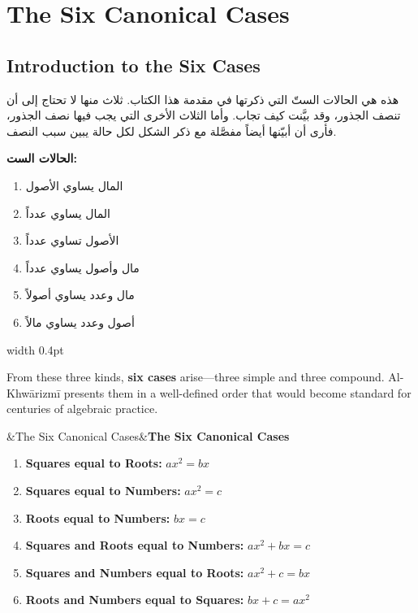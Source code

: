 \documentclass[11pt,a4paper,openany,oneside]{book}
\newenvironment{transbox}[1][]{%
  \smallskip\par\noindent
  \begin{lrbox}{\transboxsave}
  \begin{minipage}{\dimexpr\linewidth-2\fboxsep-2\fboxrule\relax}%
  \setlength{\parskip}{0.3em}%
  \ifx&#1&\else\textbf{#1}\\[0.2cm]\fi
}{%
  \end{minipage}%
  \end{lrbox}
  \fcolorbox{rulecolor}{transbg}{\usebox{\transboxsave}}%
  \smallskip}
\begin{document}
\chapter{The Six Canonical Cases}
\label{ch:six-cases}

\section*{Introduction to the Six Cases}

\noindent\begin{minipage}[t]{0.48\textwidth}
\raggedleft

\begin{Arabic}
هذه هي الحالات الستّ التي ذكرتها في مقدمة هذا الكتاب. ثلاث منها لا تحتاج إلى أن تنصف الجذور، وقد بيَّنت كيف تجاب. وأما الثلاث الأخرى التي يجب فيها نصف الجذور، فأرى أن أبيّنها أيضاً مفصَّلة مع ذكر الشكل لكل حالة يبين سبب النصف.

\textbf{الحالات الست:}
\begin{enumerate}[label=\arabic*.]
\item المال يساوي الأصول
\item المال يساوي عدداً
\item الأصول تساوي عدداً
\item مال وأصول يساوي عدداً
\item مال وعدد يساوي أصولاً
\item أصول وعدد يساوي مالاً
\end{enumerate}
\end{Arabic}

\end{minipage}%
\hfill\vrule width 0.4pt\hfill
\begin{minipage}[t]{0.48\textwidth}
\raggedright

From these three kinds, \textbf{six cases} arise---three simple and three compound. Al-Khw\=arizm\={i} presents them in a well-defined order that would become standard for centuries of algebraic practice.

\begin{transbox}[The Six Canonical Cases]
\begin{enumerate}[label=\textbf{Case \Roman*:},leftmargin=2.5em,topsep=2pt]
  \item \textbf{Squares equal to Roots:} $ax^2 = bx$
  \item \textbf{Squares equal to Numbers:} $ax^2 = c$
  \item \textbf{Roots equal to Numbers:} $bx = c$
  \item \textbf{Squares and Roots equal to Numbers:} $ax^2 + bx = c$
  \item \textbf{Squares and Numbers equal to Roots:} $ax^2 + c = bx$
  \item \textbf{Roots and Numbers equal to Squares:} $bx + c = ax^2$
\end{enumerate}
\end{transbox}

\end{minipage}
\vspace{0.3cm}
\end{document}
